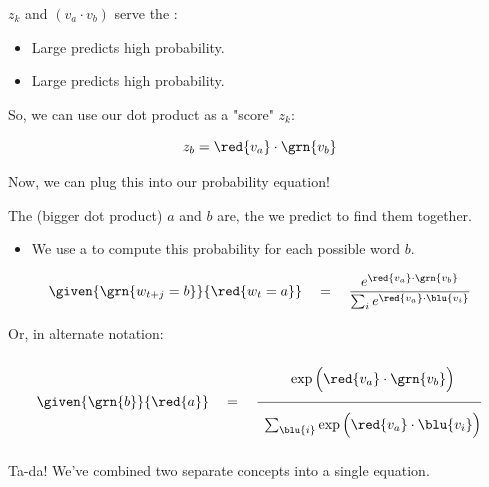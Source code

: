         $z_k$ and $(v_a \cdot v_b)$ serve the :

        \begin{itemize}
            \item Large  predicts high probability.
            \item Large  predicts high probability.
        \end{itemize}

        So, we can use our dot product as a "score" $z_k$:

        \begin{equation}
            z_b = \red{v_a} \cdot \grn{v_b}
        \end{equation}

        Now, we can plug this into our probability equation!\\

        \begin{kequation}
            The  (bigger dot product) $a$ and $b$ are, the  we predict to find them together.

            \begin{itemize}
                \item We use a  to compute this probability for each possible word $b$.
            \end{itemize}

            \begin{equation*}
                    \given{ \grn{w_{t+j} = b} }{ \red{w_t=a} } 
                    \quad=\quad
                    \frac{e^{\red{v_a} \cdot \grn{v_b}} }{ \sum_i e^{\red{v_a} \cdot \blu{v_i} }}
            \end{equation*}

            Or, in alternate notation: 
            
            \begin{equation*}
                \given{ \grn{b} }{ \red{a} } 
                \quad=\quad
                \frac{  \phantom{ \Bigg|} 
                \exp \Big(\red{v_a} \cdot \grn{v_b}\Big) }
                {\phantom{ \Bigg|}
                \sum_{\blu{i}} \exp \Big(\red{v_a} \cdot \blu{v_i} \Big) }
            \end{equation*}
        \end{kequation}

        Ta-da! We've combined two separate concepts into a single equation.



